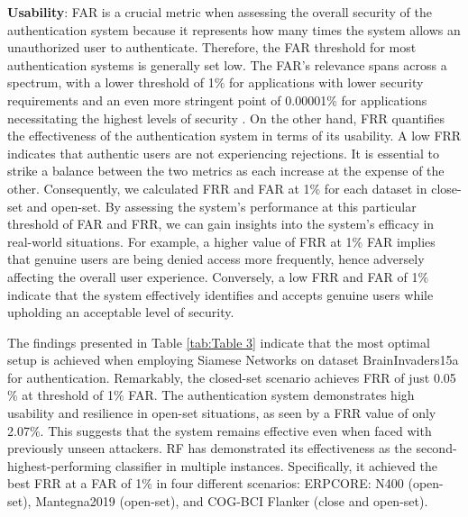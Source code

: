 %
\textbf{\large Usability}: FAR is a crucial metric when assessing the overall security of the authentication system because it represents how many times the system allows an unauthorized user to authenticate. Therefore, the FAR threshold for most authentication systems is generally set low. The FAR's relevance spans across a spectrum, with a lower threshold of 1$\%$ for applications with lower security requirements and an even more stringent point of 0.00001$\%$ for applications necessitating the highest levels of security \cite{ann2007biometric}. On the other hand, FRR quantifies the effectiveness of the authentication system in terms of its usability. A low FRR indicates that authentic users are not experiencing rejections. It is essential to strike a balance between the two metrics as each increase at the expense of the other. Consequently, we calculated FRR and FAR at 1$\%$ for each dataset in close-set and open-set. By assessing the system's performance at this particular threshold of FAR and FRR, we can gain insights into the system's efficacy in real-world situations. For example, a higher value of FRR at 1$\%$ FAR implies that genuine users are being denied access more frequently, hence adversely affecting the overall user experience. Conversely, a low FRR and FAR of 1$\%$ indicate that the system effectively identifies and accepts genuine users while upholding an acceptable level of security. 
\smallskip

The findings presented in Table \ref{tab:Table 3} indicate that the most optimal setup is achieved when employing Siamese Networks on dataset BrainInvaders15a for authentication. Remarkably, the closed-set scenario achieves FRR of just 0.05$\%$ at threshold of 1$\%$ FAR. 
The authentication system demonstrates high usability and resilience in open-set situations, as seen by a FRR value of only 2.07$\%$. This suggests that the system remains effective even when faced with previously unseen attackers. RF has demonstrated its effectiveness as the second-highest-performing classifier in multiple instances. Specifically, it achieved the best FRR at a FAR of 1$\%$ in four different scenarios: ERPCORE: N400 (open-set), Mantegna2019 (open-set), and COG-BCI Flanker (close and open-set). 

